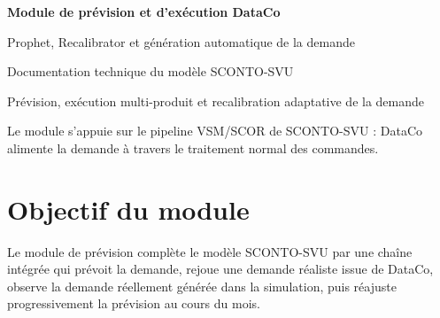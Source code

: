 \documentclass[11pt,a4paper]{article}
\newcommand{\code}[1]{\texttt{#1}}
\begin{document}
\begin{titlepage}
\centering
\vspace*{2.2cm}
{\Huge\bfseries\color{cpblue} Module de prévision et d'exécution DataCo\par}
\vspace{0.45cm}
{\LARGE Prophet, Recalibrator et génération automatique de la demande\par}
\vspace{1.3cm}
{\large Documentation technique du modèle SCONTO-SVU\par}
\vspace{1.6cm}
\vfill
{\large Prévision, exécution multi-produit et recalibration adaptative de la demande\par}
\vspace{0.5cm}
{\small Le module s'appuie sur le pipeline VSM/SCOR de SCONTO-SVU : DataCo alimente la demande à travers le traitement normal des commandes.\par}
\end{titlepage}

\tableofcontents
\newpage

\section{Objectif du module}

Le module de prévision complète le modèle SCONTO-SVU par une chaîne intégrée qui prévoit la demande, rejoue une demande réaliste issue de DataCo, observe la demande réellement générée dans la simulation, puis réajuste progressivement la prévision au cours du mois.
\end{document}
